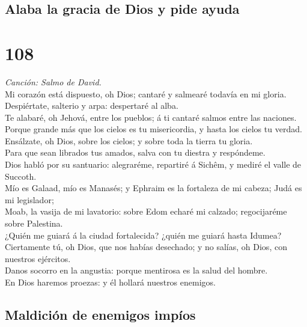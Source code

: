 \hypertarget{alaba-la-gracia-de-dios-y-pide-ayuda}{%
\subsection{Alaba la gracia de Dios y pide
ayuda}\label{alaba-la-gracia-de-dios-y-pide-ayuda}}

\hypertarget{section-107}{%
\section{108}\label{section-107}}

 \emph{Canción: Salmo de David.}\\
Mi corazón está dispuesto, oh Dios; cantaré y salmearé todavía en mi
gloria.\\
 Despiértate, salterio y arpa: despertaré al alba.\\
 Te alabaré, oh Jehová, entre los pueblos; á ti cantaré
salmos entre las naciones.\\
 Porque grande más que los cielos es tu misericordia, y
hasta los cielos tu verdad.\\
 Ensálzate, oh Dios, sobre los cielos; y sobre toda la
tierra tu gloria.\\
 Para que sean librados tus amados, salva con tu diestra y
respóndeme.\\
 Dios habló por su santuario: alegraréme, repartiré á
Sichêm, y mediré el valle de Succoth.\\
 Mío es Galaad, mío es Manasés; y Ephraim es la fortaleza de
mi cabeza; Judá es mi legislador;\\
 Moab, la vasija de mi lavatorio: sobre Edom echaré mi
calzado; regocijaréme sobre Palestina.\\
 ¿Quién me guiará á la ciudad fortalecida? ¿quién me guiará
hasta Idumea?\\
 Ciertamente tú, oh Dios, que nos habías desechado; y no
salías, oh Dios, con nuestros ejércitos.\\
 Danos socorro en la angustia: porque mentirosa es la salud
del hombre.\\
 En Dios haremos proezas: y él hollará nuestros enemigos.

\hypertarget{maldiciuxf3n-de-enemigos-impuxedos}{%
\subsection{Maldición de enemigos
impíos}\label{maldiciuxf3n-de-enemigos-impuxedos}}

